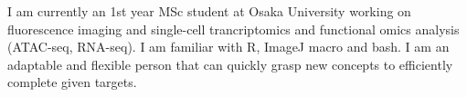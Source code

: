 

\begin{cvparagraph}

I am currently an 1st year MSc student at Osaka University working on fluorescence imaging and single-cell trancriptomics and functional omics analysis (ATAC-seq, RNA-seq). I am familiar with R, ImageJ macro and bash. I am an adaptable and flexible person that can quickly grasp new concepts to efficiently complete given targets. 
\end{cvparagraph}
